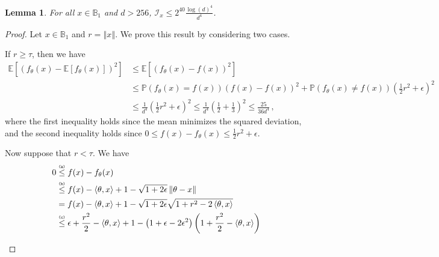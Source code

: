 \documentclass[letter, 12pt]{report}
\newcommand{\explan}[1]{\stackrel{\text{\tiny \texttt{#1}}}}
\newcommand{\ip}[1]{\left \langle #1 \right \rangle}
\newcommand{\ball}{\mathbb{B}}
\newcommand{\paren}[1]{\left( #1 \right)}
\newcommand{\brak}[1]{\left[ #1 \right]}
\newcommand{\norm}[1]{\left \Vert  #1 \right \Vert}
\newcommand{\E}{\mathbb E}
\newcommand{\I}{\mathcal{I}}
\newcommand{\1}{\mathbf{1}}
\newcommand{\mP}{\mathbb{P}}
\theoremstyle{plain}
\newtheorem{lemma}[theorem]{Lemma}
\theoremstyle{definition}
\theoremstyle{remark}
\begin{document}
\begin{lemma}\label{lem:small-I-anyr}
    For all $x \in \mathbb{B}_1$ and $d > 256$,
    $
        \I_x \leq 2^{40} \frac{\log(d)^4}{d^4}$.
\end{lemma}
\begin{proof}
    Let $x \in \ball_1$ and $r = \norm{x}$.
    We prove this result by considering two cases.
    \begin{enumcases}
        \item If $r \geq \tau$, then we have
        \begin{align}
            \E\brak{
                \paren{f_\theta(x) - \E\brak{f_\theta(x)}}^2
            }
             & \leq
            \E\brak{
                \paren{f_\theta(x) - f(x)}^2
            }
            \label{ineq:small-I-mean-min}
            \\
             & \leq
            \mP\paren{f_\theta(x) = f(x)}
            \paren{f(x) - f(x)}^2
            +
            \mP\paren{f_\theta(x) \neq f(x)}
            \paren{\frac12 r^2 + \epsilon}^2
            \nonumber
            \\
             & \leq
            \frac{1}{d^4}\paren{\frac12 r^2 + \epsilon}^2
            \leq
            \frac{1}{d^4}\paren{\frac12 + \frac13}^2
            \leq
            \frac{25}{36d^4}
            \, ,\nonumber
        \end{align}
        where the first inequality holds since the mean minimizes the squared deviation,
        and the second inequality holds since $0 \leq f(x) - f_\theta(x) \leq \frac12 r^2 + \epsilon$.
        \item Now suppose that $r < \tau$.
        We have
        \begin{align*}
            0
             &
            \explan{(a)}
            \leq
            f(x) - f_\theta(x)
            \\
             &
            \explan{(b)}
            \leq
            f(x)
            - \ip{\theta, x} + 1 - \sqrt{1 + 2\epsilon}\norm{\theta - x}
            \\
             & =
            f(x)
            - \ip{\theta, x} + 1 - \sqrt{1 + 2\epsilon}\sqrt{1 + r^2 - 2\ip{\theta, x}}
            \\
             &
            \explan{(c)}
            \leq
            \epsilon
            +
            \frac{r^2}{2}
            - \ip{\theta, x} + 1 - \paren{1 + \epsilon - 2\epsilon^2}
            \paren{
                1 +
                \frac{r^2}{2} - \ip{\theta, x}
}
\end{align*}
\end{enumcases}
\end{proof}
\end{document}
